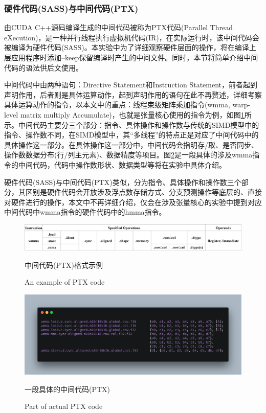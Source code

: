 \subsubsection{硬件代码(SASS)与中间代码(PTX)}
\par 由CUDA C++源码编译生成的中间代码被称为PTX代码(Parallel Thread eXecution)\cite{PTX}，是一种并行线程执行虚拟机代码(IR)，在实际运行时，该中间代码会被编译为硬件代码(SASS)。本实验中为了详细观察硬件层面的操作，将在编译上层应用程序时添加--keep保留编译时产生的中间文件。同时，本节将简单介绍中间代码的语法供后文使用。
\par 中间代码中由两种语句：Directive Statement和Instruction Statement，前者起到声明作用，后者则是具体运算动作，起到声明作用的语句在此不再赘述，详细考察具体运算动作的指令，以本文中的重点：线程束级矩阵乘加指令(wmma, warp-level matrix multiply Accumulate)，也就是张量核心使用的指令为例，如图\ref{Fig.Inst}所示。中间代码主要分三个部分：指令、具体操作和操作数与传统的SIMD模型中的指令、操作数不同，在SIMD模型中，其“多线程”的特点正是对应了中间代码中的具体操作这一部分。在具体操作这一部分中，中间代码会指明存/取、是否同步、操作数数据分布(行/列主元素)、数据精度等项目。图\ref{Fig.ActualInst}是一段具体的涉及wmma指令的中间代码，代码中操作数形状、数据类型等将在实验中具体介绍。
\par 硬件代码(SASS)与中间代码(PTX)类似，分为指令、具体操作和操作数三个部分，其区别是硬件代码会开放涉及浮点数存储方式、分支预测操作等底层的、直接对硬件进行的操作，本文中不再详细介绍，仅会在涉及张量核心的实验中提到对应中间代码中wmma指令的硬件代码中的hmma指令。
\begin{figure}
	\centering
	\includegraphics[width=15cm]{figures/Inst.jpg}
	\renewcommand{\thefigure}{\arabic{section}-\arabic{figure} }
	\renewcommand{\figurename}{图}
	\caption{中间代码(PTX)格式示例} 
	\addtocounter{figure}{-1}
	\renewcommand{\thefigure}{\arabic{section}-\arabic{figure} }
	\renewcommand{\figurename}{Figure}
	\caption{An example of PTX code}
	\label{Fig.Inst}
\end{figure}
\begin{figure}
	\centering
	\includegraphics[width=15cm]{figures/ActualInst.jpg}
	\renewcommand{\thefigure}{\arabic{section}-\arabic{figure} }
	\renewcommand{\figurename}{图}
	\caption{一段具体的中间代码(PTX)}
	\addtocounter{figure}{-1}
	\renewcommand{\thefigure}{\arabic{section}-\arabic{figure} }
	\renewcommand{\figurename}{Figure}
	\caption{Part of actual PTX code}
	\label{Fig.ActualInst}
\end{figure}
